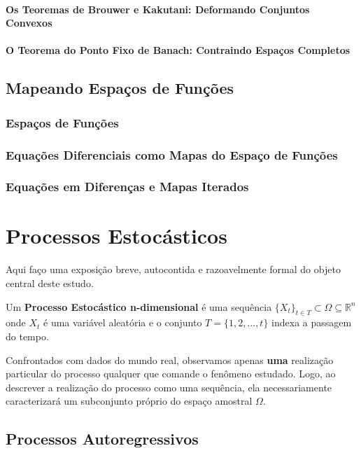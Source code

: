 \subsubsection{Os Teoremas de Brouwer e Kakutani: Deformando Conjuntos Convexos}
\subsubsection{O Teorema do Ponto Fixo de Banach: Contraindo Espaços Completos}



\section{Mapeando Espaços de Funções}
\label{quarta}
\subsection{Espaços de Funções}
\subsection{Equações Diferenciais como Mapas do Espaço de Funções}
\subsection{Equações em Diferenças e Mapas Iterados}


\chapter{Processos Estocásticos}

Aqui faço uma exposição breve, autocontida e razoavelmente formal do objeto central deste estudo.


\begin{defi}

Um \textbf{Processo Estocástico n-dimensional} é uma sequência  $\{X_t\}_{t \in T} \subset \Omega \subseteq \mathbb{R}^n$ onde $X_t$ é uma variável aleatória e o conjunto $T = \{1,2,...,t\}$ indexa a passagem do tempo.  
\end{defi}

Confrontados com dados do mundo real, observamos apenas \textbf{uma} realização particular do processo qualquer que comande o fenômeno estudado. Logo, ao descrever a realização do processo como uma sequência, ela necessariamente caracterizará um subconjunto próprio do espaço amostral $\Omega$. 

\section{Processos Autoregressivos}

